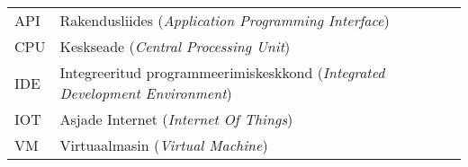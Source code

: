 \begin{longtable}{p{3cm}p{10cm}}
API&Rakendusliides (\emph{Application Programming Interface})\\
CPU&Keskseade (\emph{Central Processing Unit})\\
IDE&Integreeritud programmeerimiskeskkond (\emph{Integrated Development Environment})\\
IOT&Asjade Internet (\emph{Internet Of Things})\\
VM&Virtuaalmasin (\emph{Virtual Machine})\\
\end{longtable}
\addtocounter{table}{-1} 